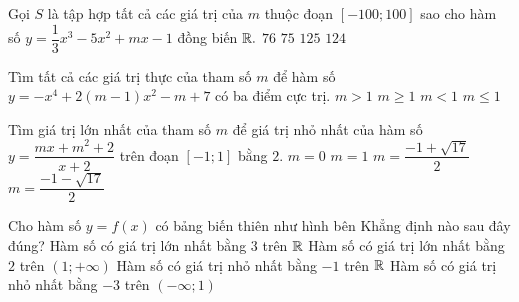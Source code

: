 \begin{ex}%
	Gọi $S$ là tập hợp tất cả các giá trị của $m$ thuộc đoạn $[-100;100]$ sao cho hàm số $y=\dfrac{1}{3}x^3-5x^2+mx-1$ đồng biến $\Bbb{R}.$
	\choice
	{\True $76$}
	{$75$}
	{$125$}
	{$124$}
\end{ex}
\begin{ex}%
	Tìm tất cả các giá trị thực của tham số $m$ để hàm số $y=-x^4+2(m-1)x^2-m+7$ có ba điểm cực trị.
	\choice
	{\True $m>1$}
	{$m\ge 1$}
	{$m<1$}
	{$m\le 1$}
\end{ex}
\begin{ex}%
	Tìm giá trị lớn nhất của tham số $m$ để giá trị nhỏ nhất của hàm số $y=\dfrac{mx+m^2+2}{x+2}$ trên đoạn $[-1;1]$ bằng $2.$
	\choice
	{$m=0$}
	{$m=1$}
	{\True $m=\dfrac{-1+\sqrt{17}}{2}$}
	{$m=\dfrac{-1-\sqrt{17}}{2}$}
\end{ex}
\begin{ex}%
	Cho hàm số $y=f(x)$ có bảng biến thiên như hình bên
	\immini
	{
		Khẳng định nào sau đây đúng?
		\choice
		{Hàm số có giá trị lớn nhất bằng $3$ trên $\Bbb{R}$}
		{Hàm số có giá trị lớn nhất bằng $2$ trên $(1;+\infty)$}
		{Hàm số có giá trị nhỏ nhất bằng $-1$ trên $\Bbb{R}$}
		{\True Hàm số có giá trị nhỏ nhất bằng $-3$ trên $(-\infty;1)$}
	}
	{
	}
	
\end{ex}
